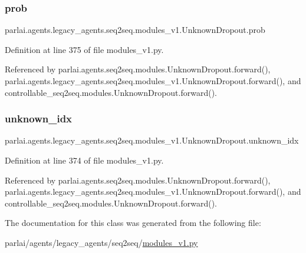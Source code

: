 \subsubsection{\texorpdfstring{prob}{prob}}
{\footnotesize\ttfamily parlai.\+agents.\+legacy\+\_\+agents.\+seq2seq.\+modules\+\_\+v1.\+Unknown\+Dropout.\+prob}



Definition at line 375 of file modules\+\_\+v1.\+py.



Referenced by parlai.\+agents.\+seq2seq.\+modules.\+Unknown\+Dropout.\+forward(), parlai.\+agents.\+legacy\+\_\+agents.\+seq2seq.\+modules\+\_\+v1.\+Unknown\+Dropout.\+forward(), and controllable\+\_\+seq2seq.\+modules.\+Unknown\+Dropout.\+forward().

\mbox{\label{classparlai_1_1agents_1_1legacy__agents_1_1seq2seq_1_1modules__v1_1_1UnknownDropout_a7c6fe2c4afa06bf542c36ea9821b243f}} 
\subsubsection{\texorpdfstring{unknown\+\_\+idx}{unknown\_idx}}
{\footnotesize\ttfamily parlai.\+agents.\+legacy\+\_\+agents.\+seq2seq.\+modules\+\_\+v1.\+Unknown\+Dropout.\+unknown\+\_\+idx}



Definition at line 374 of file modules\+\_\+v1.\+py.



Referenced by parlai.\+agents.\+seq2seq.\+modules.\+Unknown\+Dropout.\+forward(), parlai.\+agents.\+legacy\+\_\+agents.\+seq2seq.\+modules\+\_\+v1.\+Unknown\+Dropout.\+forward(), and controllable\+\_\+seq2seq.\+modules.\+Unknown\+Dropout.\+forward().



The documentation for this class was generated from the following file\+:\begin{DoxyCompactItemize}
\item 
parlai/agents/legacy\+\_\+agents/seq2seq/\hyperlink{modules__v1_8py}{modules\+\_\+v1.\+py}\end{DoxyCompactItemize}
